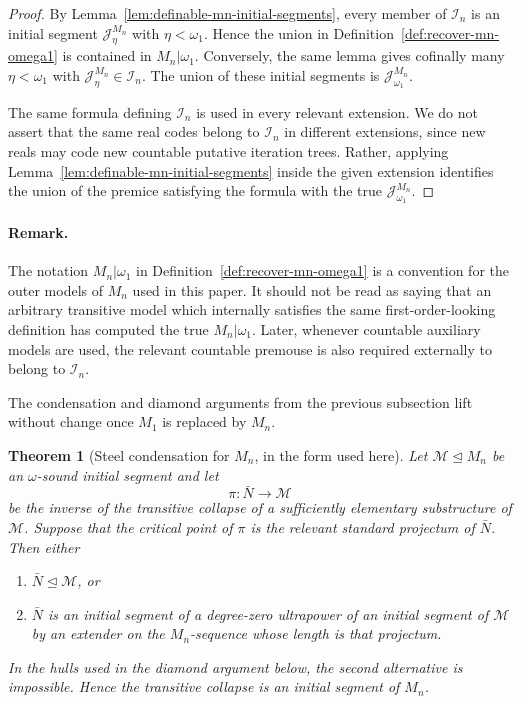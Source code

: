 \documentclass[a4paper,11pt]{article}
\newtheorem{theorem}{Theorem}[section]
\begin{document}
\begin{proof}
By Lemma~\ref{lem:definable-mn-initial-segments}, every member of $\mathcal I_n$ is an initial segment $\mathcal J^{M_n}_\eta$ with $\eta<\omega_1$.  Hence the union in Definition~\ref{def:recover-mn-omega1} is contained in $M_n|\omega_1$.  Conversely, the same lemma gives cofinally many $\eta<\omega_1$ with $\mathcal J^{M_n}_\eta\in\mathcal I_n$.  The union of these initial segments is $\mathcal J^{M_n}_{\omega_1}$.

The same formula defining $\mathcal I_n$ is used in every relevant extension.  We do not assert that the same real codes belong to $\mathcal I_n$ in different extensions, since new reals may code new countable putative iteration trees.  Rather, applying Lemma~\ref{lem:definable-mn-initial-segments} inside the given extension identifies the union of the premice satisfying the formula with the true $\mathcal J^{M_n}_{\omega_1}$.
\end{proof}

\paragraph{Remark.}\label{rem:mn-omega1-not-absolute}
The notation $M_n|\omega_1$ in Definition~\ref{def:recover-mn-omega1} is a convention for the outer models of $M_n$ used in this paper.  It should not be read as saying that an arbitrary transitive model which internally satisfies the same first-order-looking definition has computed the true $M_n|\omega_1$.  Later, whenever countable auxiliary models are used, the relevant countable premouse is also required externally to belong to $\mathcal I_n$.

The condensation and diamond arguments from the previous subsection lift without change once $M_1$ is replaced by $M_n$.

\begin{theorem}[Steel condensation for $M_n$, in the form used here]\label{thm:steel-condensation-mn}
Let $\mathcal M\trianglelefteq M_n$ be an $\omega$-sound initial segment and let
\[
   \pi:\bar N\rightarrow\mathcal M
\]
be the inverse of the transitive collapse of a sufficiently elementary substructure of $\mathcal M$.  Suppose that the critical point of $\pi$ is the relevant standard projectum of $\bar N$.  Then either
\begin{enumerate}
   \item $\bar N\trianglelefteq\mathcal M$, or
   \item $\bar N$ is an initial segment of a degree-zero ultrapower of an initial segment of $\mathcal M$ by an extender on the $M_n$-sequence whose length is that projectum.
\end{enumerate}
In the hulls used in the diamond argument below, the second alternative is impossible.  Hence the transitive collapse is an initial segment of $M_n$.
\end{theorem}
\end{document}

